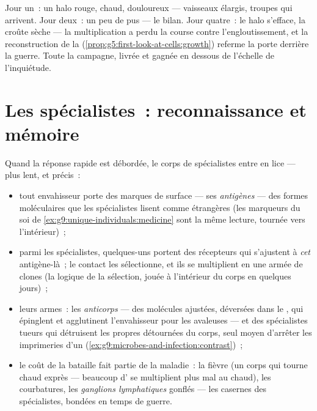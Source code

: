 \begin{example}\label{ex:g9:immune-defenses:cut}
Jour un~: un halo rouge, chaud, douloureux --- vaisseaux
élargis, troupes qui arrivent. Jour deux~: un peu de pus ---
le bilan. Jour quatre~: le halo s'efface, la croûte
sèche --- la multiplication a perdu la course contre
l'engloutissement, et la reconstruction de la 
(\cref{prop:g5:first-look-at-cells:growth}) referme la porte
derrière la guerre. Toute la campagne, livrée et gagnée
en dessous de l'échelle de l'inquiétude.
\end{example}

\section{Les spécialistes~: reconnaissance et mémoire}

\begin{proposition}\label{prop:g9:immune-defenses:specific}
Quand la réponse rapide est débordée, le corps de
spécialistes entre en lice --- plus lent, et précis~:
\begin{itemize}
  \item tout envahisseur porte des marques de surface ---
        ses \emph{antigènes} --- des formes
        moléculaires que les spécialistes lisent comme
        étrangères (les marqueurs du soi de
        \cref{ex:g9:unique-individuals:medicine} sont la
        même lecture, tournée vers l'intérieur)~;
  \item parmi les  spécialistes, quelques-uns
        portent des récepteurs qui s'ajustent à \emph{cet}
        antigène-là~; le contact les sélectionne, et ils se
        multiplient en une armée de clones (la logique de la
        sélection, jouée à l'intérieur du corps en quelques
        jours)~;
  \item leurs armes~: les \emph{anticorps}
        --- des molécules ajustées, déversées dans le ,
        qui épinglent et agglutinent l'envahisseur pour les
        avaleuses --- et des spécialistes tueurs qui
        détruisent les propres  détournées du corps,
        seul moyen d'arrêter les imprimeries d'un 
        (\cref{ex:g9:microbes-and-infection:contrast})~;
  \item le coût de la bataille fait partie de la maladie~:
        la fièvre (un corps qui tourne chaud exprès ---
        beaucoup d' se multiplient plus mal
        au chaud), les courbatures, les \emph{ganglions
        lymphatiques} gonflés --- les casernes des
        spécialistes, bondées en temps de guerre.
\end{itemize}
\end{proposition}
\admitted

